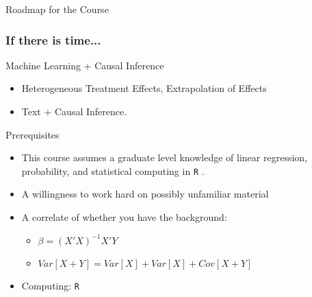 \documentclass{beamer}
\numberwithin{equation}{section}
\begin{document}
\begin{frame}{Roadmap for the Course}
\begin{itemize}
 
\end{itemize}

\end{frame}


\begin{frame}
\frametitle{If there is time...}
Machine Learning + Causal Inference
\begin{itemize}
\item Heterogeneous Treatment Effects, Extrapolation of Effects
\item Text + Causal Inference. 
\end{itemize}  



\end{frame}


\begin{frame}{Prerequisites}

\begin{itemize}

\item This course assumes a graduate level knowledge of linear regression, probability, and statistical computing in \texttt{R} .\bigskip


\item A willingness to work \alert{hard} on possibly unfamiliar material\bigskip

\item  A correlate of whether you have the background:\bigskip

\begin{itemize}
\itemsep1pt\parskip0pt
\item
  $\beta = (X'X)^{-1}X'Y$\bigskip
\item
  $Var[X + Y] =  Var[X] + Var[X] + Cov[X + Y]$\bigskip
\end{itemize}
\item  Computing: \texttt{R}
\end{itemize}

\end{frame}
\end{document}
